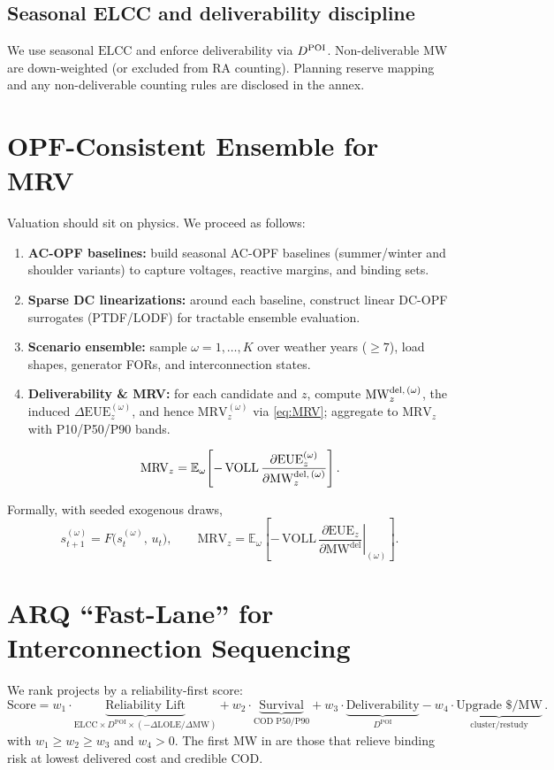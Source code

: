 \documentclass[11pt]{article}
\newcommand{\ELCC}{\ensuremath{\mathrm{ELCC}}}
\newcommand{\VOLL}{\ensuremath{\mathrm{VOLL}}}
\newcommand{\EUE}{\ensuremath{\mathrm{EUE}}}
\newcommand{\LOLE}{\ensuremath{\mathrm{LOLE}}}
\newcommand{\MRV}{\ensuremath{\mathrm{MRV}}}
\numberwithin{equation}{section}
\theoremstyle{definition}
\theoremstyle{remark}
\begin{document}
\subsection{Seasonal ELCC and deliverability discipline}
We use seasonal $\ELCC$ and enforce deliverability via $\Ddel$. Non-deliverable MW are down-weighted (or excluded from RA counting). Planning reserve mapping and any non-deliverable counting rules are disclosed in the annex.

\section{OPF-Consistent Ensemble for MRV}
\label{sec:opf-ensemble}
Valuation should sit on physics. We proceed as follows:
\begin{enumerate}[leftmargin=1.2em]
\item \textbf{AC-OPF baselines:} build seasonal AC-OPF baselines (summer/winter and shoulder variants) to capture voltages, reactive margins, and binding sets.
\item \textbf{Sparse DC linearizations:} around each baseline, construct linear DC-OPF surrogates (PTDF/LODF) for tractable ensemble evaluation.
\item \textbf{Scenario ensemble:} sample $\omega=1,\dots,K$ over weather years ($\geq 7$), load shapes, generator FORs, and interconnection states.
\item \textbf{Deliverability \& MRV:} for each candidate and $z$, compute
$\MWdel[z][(\omega)]$, the induced $\Delta \EUE_{z}^{(\omega)}$, and hence
$\MRV_{z}^{(\omega)}$ via \eqref{eq:MRV}; aggregate to $\MRV_{z}$ with
P10/P50/P90 bands.

\[
\MRV_{z}
= \mathbb{E}_{\omega}\!\left[
  -\,\VOLL\,
  \frac{\partial \EUE_{z}^{(\omega)}}{\partial \MWdel[z][(\omega)]}
\right].
\]
\end{enumerate}
Formally, with seeded exogenous draws,
\begin{equation}
  s_{t+1}^{(\omega)} = F\!\bigl(s_t^{(\omega)},\,u_t\bigr),
  \qquad
  \MRV_{z}
  = \mathbb{E}_{\omega}\!\left[
      -\,\VOLL\,
      \left.\frac{\partial \EUE_{z}}{\partial \mathrm{MW}^{\mathrm{del}}}\right|_{(\omega)}
    \right].
\end{equation}

\section{ARQ ``Fast-Lane'' for Interconnection Sequencing}
We rank projects by a reliability-first score:
\begin{equation}
\text{Score}
= w_1\cdot \underbrace{\text{Reliability Lift}}_{\ELCC \times D^{\mathrm{POI}} \times (-\Delta\LOLE/\Delta \mathrm{MW})}
+ w_2\cdot \underbrace{\text{Survival}}_{\text{COD P50/P90}}
+ w_3\cdot \underbrace{\text{Deliverability}}_{D^{\mathrm{POI}}}
- w_4\cdot \underbrace{\text{Upgrade } \$/\mathrm{MW}}_{\text{cluster/restudy}}\,.
\end{equation}
with $w_1\ge w_2\ge w_3$ and $w_4>0$. The first MW in are those that relieve binding risk at lowest delivered cost and credible COD.
\end{document}
